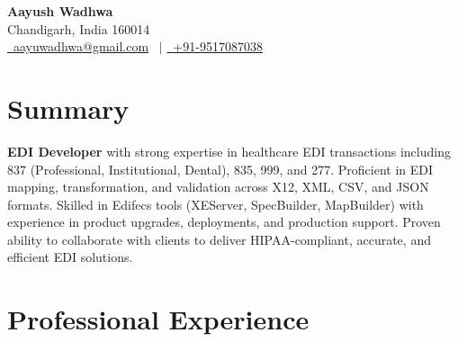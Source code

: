 \documentclass[a4paper,12pt]{article}
\begin{document}
\pagestyle{empty}

\begin{center}
    {\Huge \textbf{Aayush Wadhwa}} \\[7.5pt]
    Chandigarh, India 160014 \\ 
    \href{mailto:aayuwadhwa@gmail.com}{\raisebox{-0.05\height}\faEnvelope\ aayuwadhwa@gmail.com} \, $|$ 
    \href{tel:+919517087038}{\raisebox{-0.05\height}\faMobile\ +91-9517087038}
\end{center}

\section{Summary}
\textbf{EDI Developer} with strong expertise in healthcare EDI transactions including 837 (Professional, Institutional, Dental), 835, 999, and 277. Proficient in EDI mapping, transformation, and validation across X12, XML, CSV, and JSON formats. Skilled in Edifecs tools (XEServer, SpecBuilder, MapBuilder) with experience in product upgrades, deployments, and production support. Proven ability to collaborate with clients to deliver HIPAA-compliant, accurate, and efficient EDI solutions.

\section{Professional Experience}
\end{document}
